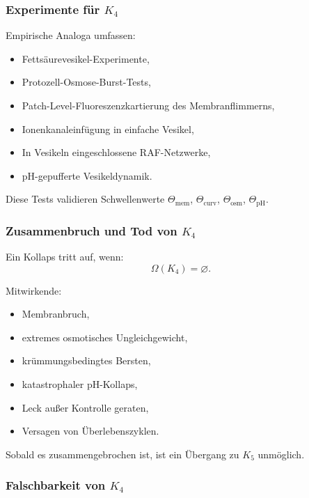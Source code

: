 \subsubsection{Experimente für \texorpdfstring{$K_4$}{K_4}}

Empirische Analoga umfassen:
\begin{itemize}
    \item Fettsäurevesikel-Experimente,
    \item Protozell-Osmose-Burst-Tests,
    \item Patch-Level-Fluoreszenzkartierung des Membranflimmerns,
    \item Ionenkanaleinfügung in einfache Vesikel,
    \item In Vesikeln eingeschlossene RAF-Netzwerke,
    \item pH-gepufferte Vesikeldynamik.
\end{itemize}

Diese Tests validieren Schwellenwerte $\Theta_{\mathrm{mem}}$,
$\Theta_{\mathrm{curv}}$, $\Theta_{\mathrm{osm}}$,
$\Theta_{\mathrm{pH}}$.

\subsubsection{Zusammenbruch und Tod von \texorpdfstring{$K_4$}{K_4}}

Ein Kollaps tritt auf, wenn:
\[
\Omega(K_4) = \varnothing.
\]

Mitwirkende:
\begin{itemize}
    \item Membranbruch,
    \item extremes osmotisches Ungleichgewicht,
    \item krümmungsbedingtes Bersten,
    \item katastrophaler pH-Kollaps,
    \item Leck außer Kontrolle geraten,
    \item Versagen von Überlebenszyklen.
\end{itemize}

Sobald es zusammengebrochen ist, ist ein Übergang zu $K_5$ unmöglich.

\subsubsection{Falschbarkeit von \texorpdfstring{$K_4$}{K_4}}

